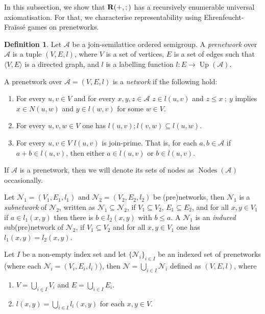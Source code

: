 \documentclass[a4paper]{article}
\theoremstyle{definition}
\newtheorem{definition}{Definition}
\theoremstyle{theorem}
\theoremstyle{proposition}
\theoremstyle{lemma}
\theoremstyle{ex}
\theoremstyle{corollary}
\theoremstyle{claim}
\begin{document}
In this subsection, we show that ${\bf R}(+, ;)$ has a recursively enumerable universal axiomatisation. For that, we characterise representability using Ehrenfeucht-Fra\"{i}ss\'{e} games on prenetworks.

\begin{definition} Let $\mathcal{A}$ be a join-semilattice ordered semigroup. A \emph{prenetwork} over $\mathcal{A}$ is a tuple $(V, E, l)$, where $V$ is a set of vertices, $E$ is a set of edges such that $\langle V, E \rangle$ is a directed graph, and $l$ is a labelling function $l : E \to \operatorname{Up}(\mathcal{A})$.

  A prenetwork over $\mathcal{A} = (V, E, l)$ is a \emph{network} if the following hold:
  \begin{enumerate}
    \item For every $u, v \in V$ and for every $x,y,z \in \mathcal{A}$ $z \in l(u, v)$ and $z \leq x \: ; \: y$ implies $x \in N(u, w)$ and $y \in l(w, v)$ for some $w \in V$.
    \item For every $u, v, w \in V$ one has $l(u, v) ; l(v, w) \subseteq l(u, w)$.
    \item For every $u, v \in V$ $l(u,v)$ is join-prime. That is, for each $a, b \in \mathcal{A}$ if $a + b \in l(u,v)$, then either $a \in l(u,v)$ or $b \in l(u,v)$.
  \end{enumerate}
\end{definition}

If $\mathcal{A}$ is a prenetwork, then we will denote its sets of nodes as $\operatorname{Nodes}(\mathcal{A})$ occasionally.

Let $\mathcal{N}_1 = (V_1, E_1, l_1)$ and $\mathcal{N}_2 = (V_2, E_2, l_2)$ be (pre)networks, then $\mathcal{N}_1$ is a \emph{subnetwork} of $\mathcal{N}_2$, written as $\mathcal{N}_1 \subseteq \mathcal{N}_2$,
if $V_1 \subseteq V_2$, $E_1 \subseteq E_2$, and for all $x, y \in V_1$ if $a \in l_1(x, y)$ then there is $b \in l_2(x, y)$ with $b \leq a$. A $\mathcal{N}_1$ is an \emph{induced} sub(pre)network of $\mathcal{N}_2$, if $V_1 \subseteq V_2$ and for all $x, y \in V_1$ one has $l_1(x,y) = l_2(x,y)$.

Let $I$ be a non-empty index set and let $\{ \mathcal{N}_i \}_{i \in I}$ be an indexed set of prenetworks (where each $\mathcal{N}_i = (V_i, E_i, l_i)$), then $\mathcal{N} = \bigcup \limits_{i \in I} \mathcal{N}_i$ defined as $(V, E, l)$, where

\begin{enumerate}
  \item $V = \bigcup \limits_{i \in I} V_i$ and $E = \bigcup \limits_{i \in I} E_i$.
  \item $l(x, y) = \bigcup \limits_{ i \in I } l_i(x, y)$ for each $x, y \in V$.
\end{enumerate}
\end{document}
